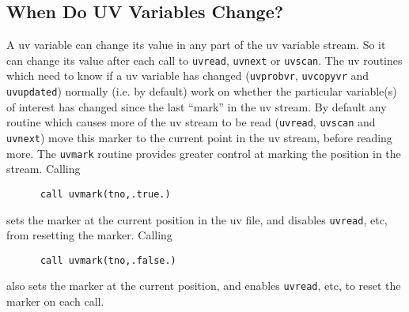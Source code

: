 \subsection{When Do UV Variables Change?}
\label{sect:uvchanges}
A uv variable can change its value in any part of the
uv variable stream. So it can change its value after each call to
{\tt uvread}, {\tt uvnext} or {\tt uvscan}. The uv routines which need to
know if a uv variable has changed ({\tt uvprobvr}, {\tt uvcopyvr} and
{\tt uvupdated}) normally (i.e. by default) work on whether the particular
variable(s) of interest has changed since the last ``mark'' in the uv stream.
By default any routine which
causes more of the uv stream to be read ({\tt uvread}, {\tt uvscan} and
{\tt uvnext}) move this marker to the current point in the uv stream, before
reading more. The {\tt uvmark} routine provides greater control at
marking the position in the stream. Calling
\begin{verbatim}
      call uvmark(tno,.true.)
\end{verbatim}
sets the marker at the current position in the uv file, and disables
{\tt uvread}, etc, from resetting the marker. Calling
\begin{verbatim}
      call uvmark(tno,.false.)
\end{verbatim}
also sets the marker at the current position, and enables {\tt uvread}, etc,
to reset the marker on each call.

